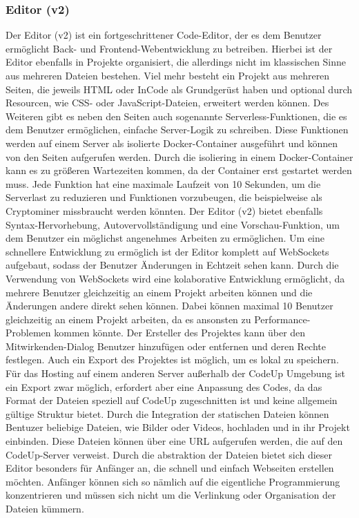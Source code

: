 \documentclass[main.tex]{subfiles}
\begin{document}
    \subsubsection{Editor (v2)}
    Der Editor (v2) ist ein fortgeschrittener Code-Editor, der es dem Benutzer ermöglicht Back- und Frontend-Webentwicklung zu betreiben.
    Hierbei ist der Editor ebenfalls in Projekte organisiert, die allerdings nicht im klassischen Sinne aus mehreren Dateien bestehen.
    Viel mehr besteht ein Projekt aus mehreren Seiten, die jeweils HTML oder InCode als Grundgerüst haben und optional durch Resourcen, wie CSS- oder JavaScript-Dateien, erweitert werden können.
    Des Weiteren gibt es neben den Seiten auch sogenannte Serverless-Funktionen, die es dem Benutzer ermöglichen, einfache Server-Logik zu schreiben.
    Diese Funktionen werden auf einem Server als isolierte Docker-Container ausgeführt und können von den Seiten aufgerufen werden.
    Durch die isoliering in einem Docker-Container kann es zu größeren Wartezeiten kommen, da der Container erst gestartet werden muss.
    Jede Funktion hat eine maximale Laufzeit von 10 Sekunden, um die Serverlast zu reduzieren und Funktionen vorzubeugen, die beispielweise als Cryptominer missbraucht werden könnten.
    Der Editor (v2) bietet ebenfalls Syntax-Hervorhebung, Autovervollständigung und eine Vorschau-Funktion, um dem Benutzer ein möglichst angenehmes Arbeiten zu ermöglichen.
    Um eine schnellere Entwicklung zu ermöglich ist der Editor komplett auf WebSockets aufgebaut, sodass der Benutzer Änderungen in Echtzeit sehen kann.
    Durch die Verwendung von WebSockets wird eine kolaborative Entwicklung ermöglicht, da mehrere Benutzer gleichzeitig an einem Projekt arbeiten können und die Änderungen andere direkt sehen können.
    Dabei können maximal 10 Benutzer gleichzeitig an einem Projekt arbeiten, da es ansonsten zu Performance-Problemen kommen könnte.
    Der Ersteller des Projektes kann über den Mitwirkenden-Dialog Benutzer hinzufügen oder entfernen und deren Rechte festlegen.
    Auch ein Export des Projektes ist möglich, um es lokal zu speichern.
    Für das Hosting auf einem anderen Server außerhalb der CodeUp Umgebung ist ein Export zwar möglich, erfordert aber eine Anpassung des Codes, da das Format der Dateien speziell auf CodeUp zugeschnitten ist und keine allgemein gültige Struktur bietet.
    Durch die Integration der statischen Dateien können Bentuzer beliebige Dateien, wie Bilder oder Videos, hochladen und in ihr Projekt einbinden.
    Diese Dateien können über eine URL aufgerufen werden, die auf den CodeUp-Server verweist.
    Durch die abstraktion der Dateien bietet sich dieser Editor besonders für Anfänger an, die schnell und einfach Webseiten erstellen möchten.
    Anfänger können sich so nämlich auf die eigentliche Programmierung konzentrieren und müssen sich nicht um die Verlinkung oder Organisation der Dateien kümmern.
\end{document}
